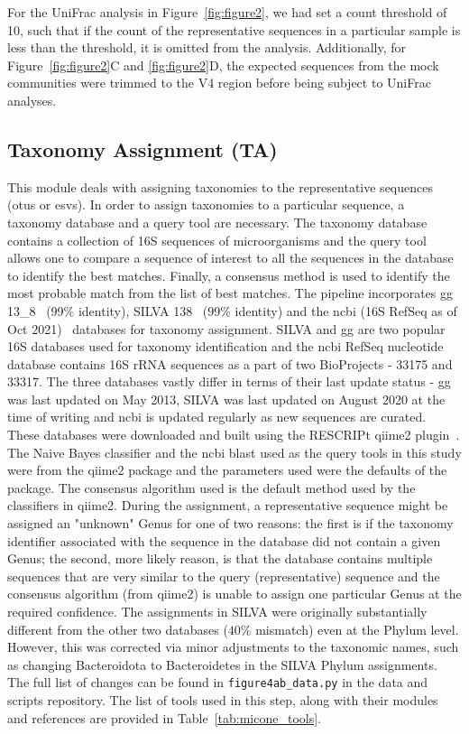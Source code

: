   For the UniFrac analysis in Figure~\ref{fig:figure2}, we had set a count threshold of 10, such that if the count of the representative sequences in a particular sample is less than the threshold, it is omitted from the analysis.
  Additionally, for Figure~\ref{fig:figure2}C and \ref{fig:figure2}D, the expected sequences from the mock communities were trimmed to the V4 region before being subject to UniFrac analyses.

  \subsection*{Taxonomy Assignment (TA)}
  \vspace{-5mm}
  This module deals with assigning taxonomies to the representative sequences (\ac{otu}s or \ac{esv}s).
  In order to assign taxonomies to a particular sequence, a taxonomy database and a query tool are necessary.
  The taxonomy database contains a collection of 16S sequences of microorganisms and the query tool allows one to compare a sequence of interest to all the sequences in the database to identify the best matches.
  Finally, a consensus method is used to identify the most probable match from the list of best matches.
  The pipeline incorporates \ac{gg} 13\_8~\cite{DeSantis2006} (99\% identity), SILVA 138~\cite{Quast2012} (99\% identity) and the \ac{ncbi} (16S RefSeq as of Oct 2021)~\cite{Sayers2009} databases for taxonomy assignment.
  SILVA and \ac{gg} are two popular 16S databases used for taxonomy identification and the \ac{ncbi} RefSeq nucleotide database contains 16S rRNA sequences as a part of two BioProjects - 33175 and 33317.
  The three databases vastly differ in terms of their last update status - \ac{gg} was last updated on May 2013, SILVA was last updated on August 2020 at the time of writing and \ac{ncbi} is updated regularly as new sequences are curated.
  These databases were downloaded and built using the RESCRIPt \ac{qiime2} plugin~\cite{iiRESCRIPtReproducibleSequence2021}.
  The Naive Bayes classifier and the \ac{ncbi} blast used as the query tools in this study were from the \ac{qiime2} package and the parameters used were the defaults of the package.
  The consensus algorithm used is the default method used by the classifiers in \ac{qiime2}.
  During the assignment, a representative sequence might be assigned an "unknown" Genus for one of two reasons: the first is if the taxonomy identifier associated with the sequence in the database did not contain a given Genus; the second, more likely reason, is that the database contains multiple sequences that are very similar to the query (representative) sequence and the consensus algorithm (from \ac{qiime2}) is unable to assign one particular Genus at the required confidence.
  The assignments in SILVA were originally substantially different from the other two databases ($40\%$ mismatch) even at the Phylum level.
  However, this was corrected via minor adjustments to the taxonomic names, such as changing Bacteroidota to Bacteroidetes in the SILVA Phylum assignments.
  The full list of changes can be found in \texttt{figure4ab\_data.py} in the data and scripts  repository.
  The list of tools used in this step, along with their modules and references are provided in Table~\ref{tab:micone_tools}.

